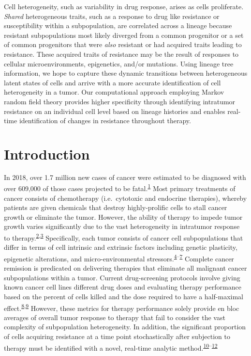 \documentclass[11pt]{article}
\begin{document}
Cell heterogeneity, such as variability in drug response, arises as
cells proliferate. \emph{Shared} heterogeneous traits, such as a
response to drug like resistance or susceptibility within a
subpopulation, are correlated across a lineage because resistant
subpopulations most likely diverged from a common progenitor or a set of
common progenitors that were \emph{also} resistant or had acquired
traits leading to resistance. These acquired traits of resistance may be
the result of responses to cellular microenvironments, epigenetics,
and/or mutations. Using lineage tree information, we hope to capture
these dynamic transitions between heterogeneous latent states of cells
and arrive with a more accurate identification of cell heterogeneity in
a tumor. Our computational approach employing Markov random field theory
provides higher specificity through identifying intratumor resistance on
an individual cell level based on lineage histories and enables
real-time identification of changes in resistance throughout therapy.

\hypertarget{introduction}{%
\section{Introduction}\label{introduction}}

In 2018, over 1.7 million new cases of cancer were estimated to be
diagnosed with over 609,000 of those cases projected to be
fatal.\textsuperscript{\protect\hyperlink{ref-SmithCancerScreening}{1}}
Most primary treatments of cancer consists of chemotherapy
(i.e.~cytotoxic and endocrine therapies), whereby patients are given
chemicals that destroy highly-prolific cells to stall cancer growth or
eliminate the tumor. However, the ability of therapy to impede tumor
growth varies significantly due to the vast heterogeneity in intratumor
response to
therapy.\textsuperscript{\protect\hyperlink{ref-LungHeterogeneity}{2},\protect\hyperlink{ref-ColorectalHeterogeneity}{3}}
Specifically, each tumor consists of cancer cell subpopulations that
differ in terms of cell intrinsic and extrinsic factors including
genetic plasticity, epigenetic alterations, and micro-environmental
stressors.\textsuperscript{\protect\hyperlink{ref-BreastMicroEnv}{4}--\protect\hyperlink{ref-HistoneInhibi}{7}}
Complete cancer remission is predicated on delivering therapies that
eliminate all malignant cancer subpopulations within a tumor. Current
drug-screening protocols involve giving known cancer cell lines
different drug doses and evaluating therapy performance based on the
percent of cells killed and the dose required to have a half-maximal
effect.\textsuperscript{\protect\hyperlink{ref-chauvin2017high}{8},\protect\hyperlink{ref-QuantitativeHistology}{9}}
However, these metrics for therapy performance solely provide en bloc
averages of overall tumor response to therapy that fail to consider the
vast complexity of subpopulation heterogeneity. In addition, the
significant proportion of cells acquiring resistance at a time point
stochastically after subjection to therapy must be identified with a
novel, real-time analytic
method.\textsuperscript{\protect\hyperlink{ref-GenotypicEGFR}{10}--\protect\hyperlink{ref-clonalMutationalEvolution}{12}}
\end{document}
